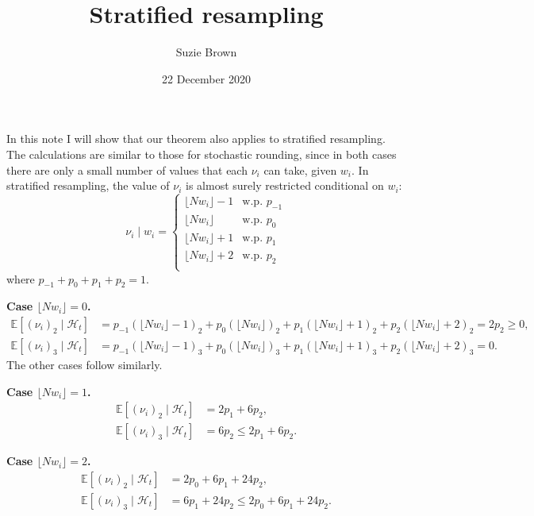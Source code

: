 \documentclass{article}
\title{Stratified resampling}
\author{Suzie Brown}
\date{22 December 2020}
\newcommand{\E}{\mathbb{E}}
\newcommand{\flnw}{\lfloor N w_i\rfloor}
\begin{document}
\maketitle
\thispagestyle{fancy}
In this note I will show that our theorem also applies to stratified resampling. The calculations are similar to those for stochastic rounding, since in both cases there are only a small number of values that each $\nu_i$ can take, given $w_i$.
In stratified resampling, the  value of $\nu_i$ is almost surely restricted conditional on $w_i$:
\begin{equation}
\nu_i \mid w_i =
\begin{cases}
\flnw -1 & \text{w.p. } p_{-1} \\
\flnw & \text{w.p. } p_{0} \\
\flnw +1 & \text{w.p. } p_{1} \\
\flnw +2 & \text{w.p. } p_{2} \\
\end{cases}
\end{equation}
where $p_{-1} + p_0 + p_1 + p_2 =1$.

\textbf{Case $\flnw =0$.}
\begin{align*}
\E[ (\nu_i)_2 \mid \mathcal{H}_t ] 
&= p_{-1} (\flnw -1)_2 + p_0 (\flnw)_2 + p_1 (\flnw +1)_2 + p_2 (\flnw +2)_2
= 2p_2 \geq 0, \\
\E[ (\nu_i)_3 \mid \mathcal{H}_t ] 
&= p_{-1} (\flnw -1)_3 + p_0 (\flnw)_3 + p_1 (\flnw +1)_3 + p_2 (\flnw +2)_3
= 0 .
\end{align*}
The other cases follow similarly.

\textbf{Case $\flnw =1$.}
\begin{align*}
\E[ (\nu_i)_2 \mid \mathcal{H}_t ] 
&= 2p_1 + 6p_2 , \\
\E[ (\nu_i)_3 \mid \mathcal{H}_t ] 
&= 6p_2 
\leq 2p_1 + 6p_2 .
\end{align*}

\textbf{Case $\flnw =2$.}
\begin{align*}
\E[ (\nu_i)_2 \mid \mathcal{H}_t ] 
&= 2p_0 + 6p_1 + 24p_2 , \\
\E[ (\nu_i)_3 \mid \mathcal{H}_t ] 
&= 6p_1 + 24p_2 
\leq 2p_0 + 6p_1 + 24p_2 .
\end{align*}
\end{document}
